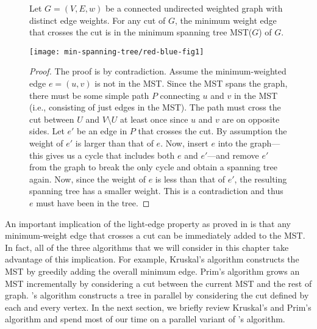 \begin{figure}
\begin{lemma} 
  Let $G = (V,E,w)$ be a connected undirected weighted graph with
  distinct edge weights.  For any cut of $G$, the minimum weight edge
  that crosses the cut is in the minimum spanning tree MST($G$) of
  $G$.
\label{lem:mst::cut}


\begin{center}
  \texttt{[image: min-spanning-tree/red-blue-fig1]}
\end{center}

\begin{proof}
  The proof is by contradiction.  Assume the minimum-weighted edge $e
  = (u,v)$ is not in the MST.  Since the MST spans the graph, there
  must be some simple path $P$ connecting $u$ and $v$ in the MST
  (i.e., consisting of just edges in the MST).  The path must cross
  the cut between $U$ and $V\setminus U$ at least once since $u$ and
  $v$ are on opposite sides. Let $e'$ be an edge in $P$ that crosses
  the cut.  By assumption the weight of $e'$ is larger than that of
  $e$.  Now, insert $e$ into the graph---this gives us a cycle
  that includes both $e$ and $e'$---and remove $e'$ from the graph to
  break the only cycle and obtain a spanning tree again.
  Now, since the
  weight of $e$ is less than that of $e'$, the resulting spanning tree
  has a smaller weight.  This is a contradiction and thus $e$ must
  have been in the tree.
\end{proof}
\end{lemma}
\end{figure}


An important implication of the light-edge property as proved in
 is that any minimum-weight edge that crosses a cut
can be immediately added to the MST.  In fact, all of the three
algorithms that we will consider in this chapter take advantage of
this implication.
%
For example, Kruskal's algorithm constructs the MST by greedily adding
the overall minimum edge.  Prim's algorithm grows an MST incrementally
by considering a cut between the current MST and the rest of
graph. \boruvka's algorithm constructs a tree in parallel by
considering the cut defined by each and every vertex.
%
In the next section, we briefly review Kruskal's and Prim's algorithm
and spend most of our time on a parallel variant of \boruvka's
algorithm.



